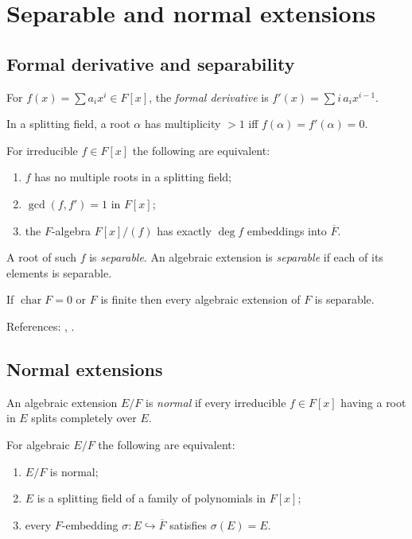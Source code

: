 \section{Separable and normal extensions}\label{sec:sep-normal}

\subsection{Formal derivative and separability}
\begin{definition}
For $f(x)=\sum a_i x^i\in F[x]$, the \emph{formal derivative} is $f'(x)=\sum i\,a_i x^{i-1}$.
\end{definition}
\begin{proposition}[Multiplicity]
In a splitting field, a root $\alpha$ has multiplicity $>1$ iff $f(\alpha)=f'(\alpha)=0$.
\end{proposition}
\begin{theorem}\label{thm:sep-criteria}
For irreducible $f\in F[x]$ the following are equivalent:
\begin{enumerate}[label=(\alph*)]
\item $f$ has no multiple roots in a splitting field;
\item $\gcd(f,f')=1$ in $F[x]$;
\item the $F$-algebra $F[x]/(f)$ has exactly $\deg f$ embeddings into $\overline{F}$.
\end{enumerate}
A root of such $f$ is \emph{separable}. An algebraic extension is \emph{separable} if each of its elements is separable.
\end{theorem}
\begin{corollary}
If $\operatorname{char}F=0$ or $F$ is finite then every algebraic extension of $F$ is separable.
\end{corollary}
References: \cite[\S13--14]{DF}, \cite[Ch.~VIII]{Lang}.

\subsection{Normal extensions}
\begin{definition}
An algebraic extension $E/F$ is \emph{normal} if every irreducible $f\in F[x]$ having a root in $E$ splits completely over $E$.
\end{definition}
\begin{theorem}\label{thm:normal}
For algebraic $E/F$ the following are equivalent:
\begin{enumerate}[label=(\alph*)]
\item $E/F$ is normal;
\item $E$ is a splitting field of a family of polynomials in $F[x]$;
\item every $F$-embedding $\sigma:E\hookrightarrow\overline{F}$ satisfies $\sigma(E)=E$.
\end{enumerate}
\end{theorem}

